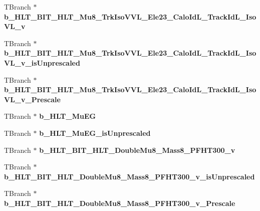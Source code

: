 \begin{DoxyCompactItemize}
\hypertarget{classMiniTree_aaabaefba791a0cb4d9f41ab01c61f874}{}\label{classMiniTree_aaabaefba791a0cb4d9f41ab01c61f874} 
T\+Branch $\ast$ {\bfseries b\+\_\+\+H\+L\+T\+\_\+\+B\+I\+T\+\_\+\+H\+L\+T\+\_\+\+Mu8\+\_\+\+Trk\+Iso\+V\+V\+L\+\_\+\+Ele23\+\_\+\+Calo\+Id\+L\+\_\+\+Track\+Id\+L\+\_\+\+Iso\+V\+L\+\_\+v}
\item 
\hypertarget{classMiniTree_a47b2820784385b5f63758e489cc10e2f}{}\label{classMiniTree_a47b2820784385b5f63758e489cc10e2f} 
T\+Branch $\ast$ {\bfseries b\+\_\+\+H\+L\+T\+\_\+\+B\+I\+T\+\_\+\+H\+L\+T\+\_\+\+Mu8\+\_\+\+Trk\+Iso\+V\+V\+L\+\_\+\+Ele23\+\_\+\+Calo\+Id\+L\+\_\+\+Track\+Id\+L\+\_\+\+Iso\+V\+L\+\_\+v\+\_\+is\+Unprescaled}
\item 
\hypertarget{classMiniTree_a31b2638438a4180334b032ac8c545f2b}{}\label{classMiniTree_a31b2638438a4180334b032ac8c545f2b} 
T\+Branch $\ast$ {\bfseries b\+\_\+\+H\+L\+T\+\_\+\+B\+I\+T\+\_\+\+H\+L\+T\+\_\+\+Mu8\+\_\+\+Trk\+Iso\+V\+V\+L\+\_\+\+Ele23\+\_\+\+Calo\+Id\+L\+\_\+\+Track\+Id\+L\+\_\+\+Iso\+V\+L\+\_\+v\+\_\+\+Prescale}
\item 
\hypertarget{classMiniTree_a6a40085bd9740d15f30b5bad29b2258f}{}\label{classMiniTree_a6a40085bd9740d15f30b5bad29b2258f} 
T\+Branch $\ast$ {\bfseries b\+\_\+\+H\+L\+T\+\_\+\+Mu\+EG}
\item 
\hypertarget{classMiniTree_ab6350785994bd0c45e7323fa5c0d5c4a}{}\label{classMiniTree_ab6350785994bd0c45e7323fa5c0d5c4a} 
T\+Branch $\ast$ {\bfseries b\+\_\+\+H\+L\+T\+\_\+\+Mu\+E\+G\+\_\+is\+Unprescaled}
\item 
\hypertarget{classMiniTree_abeed3a80ab2e11fbc97b3591f2fc3ccc}{}\label{classMiniTree_abeed3a80ab2e11fbc97b3591f2fc3ccc} 
T\+Branch $\ast$ {\bfseries b\+\_\+\+H\+L\+T\+\_\+\+B\+I\+T\+\_\+\+H\+L\+T\+\_\+\+Double\+Mu8\+\_\+\+Mass8\+\_\+\+P\+F\+H\+T300\+\_\+v}
\item 
\hypertarget{classMiniTree_a8f57f17d2387cd1a4e1d7a778c784a78}{}\label{classMiniTree_a8f57f17d2387cd1a4e1d7a778c784a78} 
T\+Branch $\ast$ {\bfseries b\+\_\+\+H\+L\+T\+\_\+\+B\+I\+T\+\_\+\+H\+L\+T\+\_\+\+Double\+Mu8\+\_\+\+Mass8\+\_\+\+P\+F\+H\+T300\+\_\+v\+\_\+is\+Unprescaled}
\item 
\hypertarget{classMiniTree_a7778e5de81ead9d261806462e9d90a79}{}\label{classMiniTree_a7778e5de81ead9d261806462e9d90a79} 
T\+Branch $\ast$ {\bfseries b\+\_\+\+H\+L\+T\+\_\+\+B\+I\+T\+\_\+\+H\+L\+T\+\_\+\+Double\+Mu8\+\_\+\+Mass8\+\_\+\+P\+F\+H\+T300\+\_\+v\+\_\+\+Prescale}
\item 
\hypertarget{classMiniTree_aa3d70474bb4c87c16f06b0d561ffbe6b}{}\label{classMiniTree_aa3d70474bb4c87c16f06b0d561ffbe6b} 

\end{DoxyCompactItemize}
